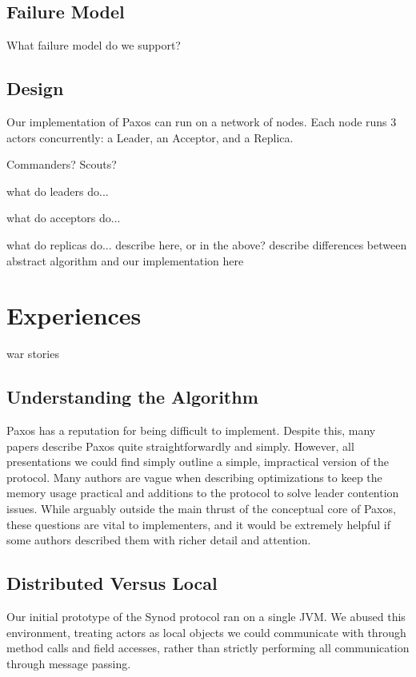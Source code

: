 \documentclass{sig-alternate}
\begin{document}
\subsection{Failure Model}
What failure model do we support?

\subsection{Design}
Our implementation of Paxos can run on a network of nodes. Each node runs 3 actors concurrently: a Leader, an Acceptor, and a Replica. 

Commanders? Scouts?

what do leaders do...

what do acceptors do...

what do replicas do...
describe here, or in the above?
describe differences between abstract algorithm and our implementation here



\section{Experiences}
war stories

\subsection{Understanding the Algorithm}

Paxos has a reputation for being difficult to implement. Despite this, many papers describe Paxos quite straightforwardly and simply. However, all presentations we could find simply outline a simple, impractical version of the protocol. Many authors are vague when describing optimizations to keep the memory usage practical and additions to the protocol to solve leader contention issues. While arguably outside the main thrust of the conceptual core of Paxos, these questions are vital to implementers, and it would be extremely helpful if some authors described them with richer detail and attention.

\subsection{Distributed Versus Local}
Our initial prototype of the Synod protocol ran on a single JVM. We abused this environment, treating actors as local objects we could communicate with through method calls and field accesses, rather than strictly performing all communication through message passing.
\end{document}
